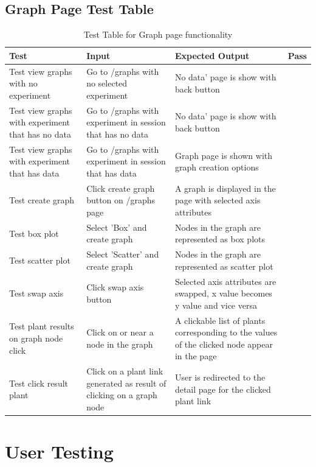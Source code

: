 \subsection{Graph Page Test Table}
\begin{table}[H]
\centering
\begin{tabular}{ | p{4cm} | p{4cm} |p{4cm} | p{1cm} | }
\hline
	Test & Input & Expected Output & Pass \\ \hline
	Test view graphs with no experiment & Go to /graphs with no selected experiment & No data' page is show with back button & \checkmark \\ \hline
	Test view graphs with experiment that has no  data & Go to /graphs with experiment in session that has no data & No data' page is show with back button & \checkmark \\ \hline
	Test view graphs with experiment that has data & Go to /graphs with experiment in session that has data & Graph page is shown with graph creation options & \checkmark \\ \hline
	Test create graph & Click create graph button on /graphs page & A graph is displayed in the page with selected axis attributes & \checkmark \\ \hline
	Test box plot & Select 'Box' and create graph & Nodes in the graph are represented as box plots & \checkmark \\ \hline
	Test scatter plot & Select 'Scatter' and create graph & Nodes in the graph are represented as scatter plot & \checkmark \\ \hline
	Test swap axis & Click swap axis button & Selected axis attributes are swapped, x value becomes y value and vice versa & \checkmark \\ \hline
	Test plant results on graph node click & Click on or near a node in the graph & A  clickable list of plants corresponding to the values of the clicked node appear in the page & \checkmark \\ \hline
	Test click result plant & Click on a plant link generated as result of clicking on a graph node & User is redirected to the detail page for the clicked plant link & \checkmark \\ \hline
\end{tabular}
\caption{Test Table for Graph page functionality}
\label{test_table_graph}
\end{table}


\section{User Testing}